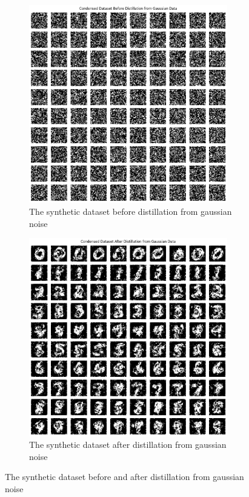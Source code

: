 \documentclass[onecolumn]{IEEEtran}
\begin{document}
\begin{figure}[H]
    \centering
    \begin{subfigure}{.5\textwidth}
        \centering
        \includegraphics[width=0.95\textwidth]{images/MNIST_datadam_before_distil_gaussian.png}
        \caption{The synthetic dataset before distillation from gaussian noise}
        \label{fig:MNIST_datadam_before_distil_gaussian}
    \end{subfigure}%
    \begin{subfigure}{.5\textwidth}
        \centering
        \includegraphics[width=0.95\textwidth]{images/MNIST_datadam_after_distil_gaussian.png}
        \caption{The synthetic dataset after distillation from gaussian noise}
        \label{fig:MNIST_datadam_after_distil_gaussian}
    \end{subfigure}
    \caption{The synthetic dataset before and after distillation from gaussian noise}
\end{figure}
\end{document}
